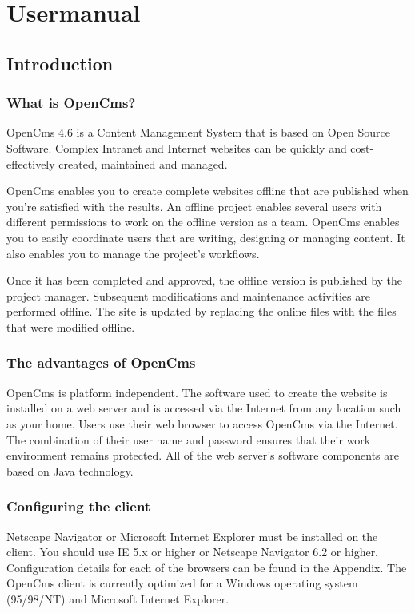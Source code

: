 \chapter{Usermanual}

\section{Introduction}

\subsection{What is OpenCms?}

OpenCms 4.6 is a Content Management System that is based on Open
Source Software. Complex Intranet and Internet websites can be
quickly and cost-effectively created, maintained and managed.

OpenCms enables you to create complete websites offline that are
published when you're satisfied with the results. An offline
project enables several users with different permissions to work
on the offline version as a team. OpenCms enables you to easily
coordinate users that are writing, designing or managing content.
It also enables you to manage the project's workflows.

Once it has been completed and approved, the offline version is
published by the project manager. Subsequent modifications and
maintenance activities are performed offline. The site is updated
by replacing the online files with the files that were modified
offline.

\subsection{The advantages of OpenCms}

OpenCms is platform independent. The software used to create the
website is installed on a web server and is accessed via the
Internet from any location such as your home. Users use their web
browser to access OpenCms via the Internet. The combination of
their user name and password ensures that their work environment
remains protected. All of the web server's software components are
based on Java technology.

\subsection{Configuring the client}

Netscape Navigator or Microsoft Internet Explorer must be
installed on the client. You should use IE 5.x or higher or
Netscape Navigator 6.2 or higher. Configuration details for each of
the browsers can be found in the Appendix. The OpenCms client is
currently optimized for a Windows operating system (95/98/NT) and
Microsoft Internet Explorer.

